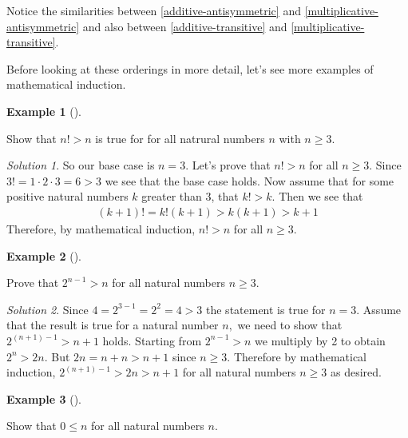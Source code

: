 \documentclass[
  twoside,
  12pt,
  letterpaper]{article}
\theoremstyle{definition}
\newtheorem{example}{Example}[section]
\theoremstyle{definition}
\theoremstyle{definition}
\theoremstyle{plain}
\theoremstyle{plain}
\theoremstyle{remark}
\newtheorem*{solution}{Solution}
\begin{document}
Notice the similarities between \eqref{additive-antisymmetric} and
\eqref{multiplicative-antisymmetric} and also between
\eqref{additive-transitive} and \eqref{multiplicative-transitive}.

Before looking at these orderings in more detail, let's see more
examples of mathematical induction.

\begin{example}[]\protect\hypertarget{exm-factorial}{}\label{exm-factorial}

Show that \(n!>n\) is true for for all natrural numbers \(n\) with
\(n\geq 3\).

\end{example}

\begin{solution}

So our base case is \(n=3\). Let's prove that \(n!>n\) for all
\(n\geq 3\). Since \(3!=1\cdot 2\cdot 3=6>3\) we see that the base case
holds. Now assume that for some positive natural numbers \(k\) greater
than 3, that \(k!>k.\) Then we see that \begin{align*} 
(k+1)! =k!(k+1) >k(k+1) >k+1
\end{align*} Therefore, by mathematical induction, \(n!>n\) for all
\(n\geq 3\).

\end{solution}

\begin{example}[]\protect\hypertarget{exm-exp}{}\label{exm-exp}

Prove that \(2^{n-1} > n\) for all natural numbers \(n\geq 3.\)

\end{example}

\begin{solution}

Since \(4=2^{3-1}=2^2=4>3\) the statement is true for \(n=3.\) Assume
that the result is true for a natural number \(n,\) we need to show that
\(2^{(n+1)-1}>n+1\) holds. Starting from \(2^{n-1}>n\) we multiply by 2
to obtain \(2^n>2n.\) But \(2n=n+n>n+1\) since \(n\geq 3.\) Therefore by
mathematical induction, \(2^{(n+1)-1}>2n>n+1\) for all natural numbers
\(n\geq 3\) as desired.

\end{solution}

\begin{example}[]\protect\hypertarget{exm-zero-is-least}{}\label{exm-zero-is-least}

Show that \(0 \leq n\) for all natural numbers \(n\).

\end{example}
\end{document}
